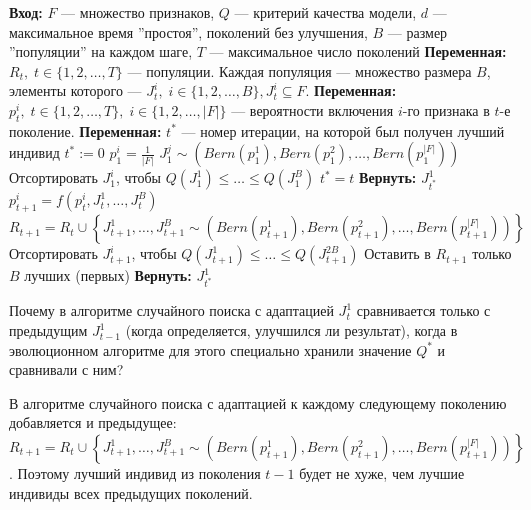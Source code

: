 \begin{algorithmic}
\State \textbf{Вход:} $F$ --- множество признаков, $Q$ --- критерий качества модели, $d$ --- максимальное время ''простоя'', поколений без улучшения, $B$ --- размер ''популяции'' на каждом шаге, $T$ --- максимальное число поколений
\State \textbf{Переменная:} $R_t, \;t \in \{1, 2, \ldots, T\}$ --- популяции. Каждая популяция --- множество размера $B$, элементы которого --- $J_t^i,\;i \in \{1, 2, \ldots, B\}, J_t^i \subseteq F$.
\State \textbf{Переменная:} $p_t^i,\;t \in \{1, 2, \ldots, T\},\;i \in \{1, 2, \ldots, |F|\}$ --- вероятности включения $i$-го признака в $t$-е поколение.
\State \textbf{Переменная:} $t^*$ --- номер итерации, на которой был получен лучший индивид
\State $t^* := 0$
    \State $p_1^i = \frac{1}{|F|}$
\EndFor
{}
    \State $J_1^j \sim \left(Bern(p_1^1), Bern(p_1^2), \ldots, Bern(p_1^{|F|})\right)$
\EndFor
\State Отсортировать $J_1^i$, чтобы $Q(J_1^1) \leqslant \ldots \leqslant Q(J_1^B)$
        \State $t^* = t$
    \EndIf
        \State \textbf{Вернуть:} $J_{t^*}^1$
    \EndIf
        \State $p_{t+1}^i = f(p_t^i, J_t^1, \ldots, J_t^B)$
    \EndFor
    \State $R_{t + 1} = R_t \cup \left\{J_{t + 1}^1, \ldots, J_{t + 1}^B \sim \left(Bern(p_{t + 1}^1), Bern(p_{t + 1}^2), \ldots, Bern(p_{t + 1}^{|F|})\right)\right\}$
    \State Отсортировать $J_{t + 1}^i$, чтобы $Q(J_{t + 1}^1) \leqslant \ldots \leqslant Q(J_{t + 1}^{2B})$
    \State Оставить в $R_{t + 1}$ только $B$ лучших (первых)
\EndFor 
\State \textbf{Вернуть:} $J_{t^*}^1$
\end{algorithmic}


\begin{problem}
    Почему в алгоритме случайного поиска с адаптацией $J_t^1$ сравнивается только с предыдущим $J_{t-1}^1$ (когда определяется, улучшился ли результат), когда в эволюционном алгоритме для этого специально хранили значение $Q^*$ и сравнивали с ним?
\end{problem}
\begin{solution}
    В алгоритме случайного поиска с адаптацией к каждому следующему поколению добавляется и предыдущее:\\ $R_{t + 1} = R_t \cup \left\{J_{t + 1}^1, \ldots, J_{t + 1}^B \sim \left(Bern(p_{t + 1}^1), Bern(p_{t + 1}^2), \ldots, Bern(p_{t + 1}^{|F|})\right)\right\}$. Поэтому лучший индивид из поколения $t-1$ будет не хуже, чем лучшие индивиды всех предыдущих поколений.
\end{solution}


